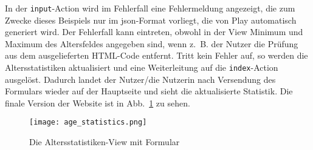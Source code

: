 In der \lstinline|input|-Action wird im Fehlerfall eine Fehlermeldung angezeigt, die zum Zwecke dieses Beispiels nur im \gls{json}-Format vorliegt, die von Play automatisch generiert wird.
Der Fehlerfall kann eintreten, obwohl in der View Minimum und Maximum des Altersfeldes angegeben sind, wenn z.~B. der Nutzer die Prüfung aus dem ausgelieferten HTML-Code entfernt.
Tritt kein Fehler auf, so werden die Altersstatistiken aktualisiert und eine Weiterleitung auf die \lstinline|index|-Action ausgelöst.
Dadurch landet der Nutzer/die Nutzerin nach Versendung des Formulars wieder auf der Hauptseite und sieht die aktualisierte Statistik.
Die finale Version der Website ist in Abb.~\ref{fig:die_altersstatistiken_view_mit_formular} zu sehen.

\begin{figure}
\centering
\texttt{[image: age\_statistics.png]}
\caption{Die Altersstatistiken-View mit Formular}
\label{fig:die_altersstatistiken_view_mit_formular}
\end{figure}






